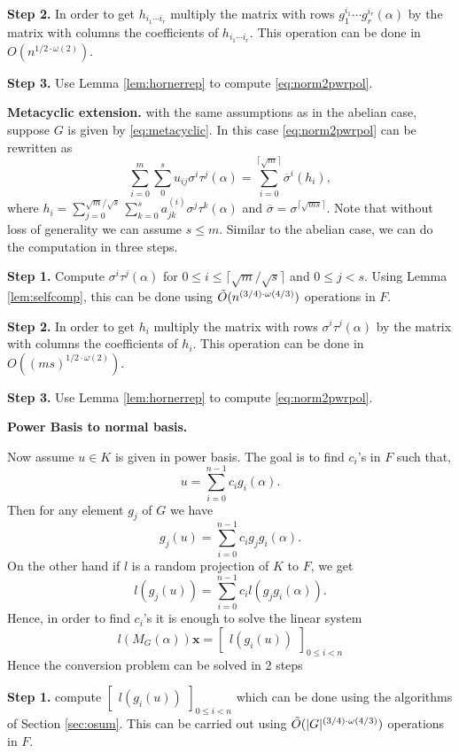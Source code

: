 \textbf{Step 2.} In order to get $h_{i_1 \cdots i_r}$ multiply the matrix with rows $g_1^{i_1} \cdots g_r^{i_r}(\alpha)$ by the
matrix with columns the coefficients of $h_{i_1 \cdots i_r}$. This operation can be done in $O(n^{1/2 \cdot \omega(2)})$.

\textbf{Step 3.} Use Lemma \ref{lem:hornerrep} to compute \eqref{eq:norm2pwrpol}. 

\textbf{Metacyclic extension.} with the same assumptions as in the abelian case, suppose $G$ is given by \eqref{eq:metacyclic}. In
this case \eqref{eq:norm2pwrpol} can be rewritten as
$$\sum_{i = 0}^m \sum_{0}^s u_{ij}\sigma^i \tau^j(\alpha) = \sum_{i = 0}^{\lceil \sqrt{m} \rceil} \overline{\sigma}^i(h_i),$$
where $h_i = \sum_{j = 0}^{\sqrt{m}/\sqrt{s}}\sum_{k =0}^{s} a_{jk}^{(i)}\sigma^j \tau^k (\alpha)$ and 
$\overline{\sigma} = \sigma^{\lceil \sqrt{ms} \rceil}$.
Note that without loss of generality we can assume $s \leq m$. Similar to the abelian case, we can do the computation in three steps.

\textbf{Step 1.} Compute $\sigma^i\tau^j(\alpha)$ for $0 \leq i \leq \lceil \sqrt{m} /\sqrt{s} \rceil$ and $0 \leq j < s$.
Using Lemma \ref{lem:selfcomp}, this can be done using $\tilde{O}(n^{(3/4)\cdot \omega(4/3)})$ operations in $F$.

\textbf{Step 2.} In order to get $h_{i}$ multiply the matrix with rows $\sigma^i\tau^j(\alpha)$ by the
matrix with columns the coefficients of $h_{i}$. This operation can be done in $O((ms)^{1/2 \cdot \omega(2)})$.

\textbf{Step 3.} Use Lemma \ref{lem:hornerrep} to compute \eqref{eq:norm2pwrpol}. 

\textbf{Power Basis to normal basis.}

Now assume $u \in K$ is given in power basis. The goal is to find $c_i$'s in $F$ such that, 
$$u = \sum_{i = 0}^{n-1} c_i g_i(\alpha).$$
Then for any element $g_j$ of $G$ we have
$$g_j(u) = \sum_{i = 0}^{n-1} c_i g_jg_i(\alpha).$$
On the other hand if $l$ is a random projection of $K$ to $F$, we get 
$$l(g_j(u)) = \sum_{i = 0}^{n-1} c_i l(g_jg_i(\alpha)).$$
Hence, in order to find $c_i$'s it is enough to solve the linear system
\begin{equation}\label{eq:convlinsys}
l(M_G(\alpha)) \textbf{x} = \begin{bmatrix} l(g_i(u)) \end{bmatrix}_{0 \leq i <n}
\end{equation}
Hence the conversion problem can be solved in 2 steps 

\textbf{Step 1.} compute $\begin{bmatrix} l(g_i(u)) \end{bmatrix}_{0 \leq i <n}$ which can be done using
the algorithms of Section \ref{sec:osum}. This can be carried out using $\tilde{O}(\vert G \vert ^{(3/4)\cdot \omega(4/3)})$ operations in $F$.

